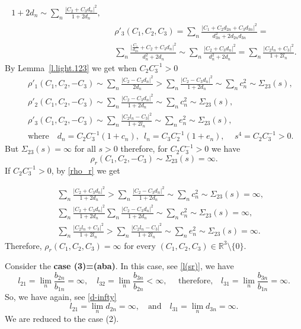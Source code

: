 \documentclass[preprint,12pt]{elsarticle}
\numberwithin{equation}{section}
\begin{document}
\begin{pf}
\begin{eqnarray*}
 {1+2d_{n}}\sim \sum_n\frac{\vert C_2\!+\!C_3d_{n}\vert^2}{1+2d_{n}},\\
&&
\rho'_3(C_1,C_2,C_3)=
\sum_n\frac{\vert C_1\!+\!C_2d_{2n}\!+\!C_3d_{3n}\vert^2}
 {d^2_{3n}+2d_{2n}d_{3n}}=
\\
 &&
\sum_n\frac{\vert \frac{C_1}{d_{2n}}\!+\!C_2\!+\!C_3d_{n}\vert^2}
 {d_n^2+2d_{n}}\sim \sum_n\frac{\vert C_2\!+\!C_3d_{n}\vert^2}{d_n^2+2d_{n}}=\sum_n\frac{\vert C_2l_n\!+\!C_3\vert^2}{1+2l_{n}}.
\end{eqnarray*}
By Lemma~\ref{l.light.123}  we get when $C_2C_3^{-1}>0$
\begin{eqnarray}
\nonumber 
&&
\rho'_1(C_1,C_2,-C_3)\sim  \sum_n\frac{\vert C_2\!-\!C_3d_{n}\vert^2}{2d_{n}}>\sum_n\frac{\vert C_2\!-\!C_3d_{n}\vert^2}{1+2d_{n}}\sim \sum_nc^2_n\sim\Sigma_{23}(s),\\
\label{rho_r}
&&
\rho'_2(C_1,C_2,-C_3)\sim  \sum_n\frac{\vert C_2\!-\!C_3d_{n}\vert^2}{1+2d_{n}}\sim \sum_nc^2_n\sim\Sigma_{23}(s),\\
\nonumber
&&
\rho'_3(C_1,C_2,-C_3)\sim  \sum_n\frac{\vert C_2l_n\!-\!C_3\vert^2}{1+2l_{n}}\sim \sum_ne^2_n\sim\Sigma_{23}(s),\\
\nonumber
&&
\text{where}\quad d_n=
C_2C_3^{-1}(1+c_n),\,\,\,l_n=C_3C_2^{-1}(1+e_n),\quad\,s^4=C_2C_3^{-1}>0.
\end{eqnarray}
But $\Sigma_{23}(s)=\infty$ for all $s>0$ therefore, for $C_2C^{-1}_3>0$ we have
\begin{equation}
\label{(2)}
\rho_r(C_1,C_2,-C_3)\sim  \Sigma_{23}(s)=\infty.
\end{equation}
If $C_2C^{-1}_3>0$, by \eqref{rho_r} we get

\begin{eqnarray*}
\nonumber 
&&
\sum_n\frac{\vert C_2\!+\!C_3d_{n}\vert^2}{1+2d_{n}}>
\sum_n\frac{\vert C_2\!-\!C_3d_{n}\vert^2}{1+2d_{n}}\sim \sum_nc^2_n\sim\Sigma_{23}(s)=\infty,\\
&&
\sum_n\frac{\vert C_2\!+\!C_3d_{n}\vert^2}{1+2d_{n}}
\sum_n\frac{\vert C_2\!-\!C_3d_{n}\vert^2}{1+2d_{n}}\sim \sum_nc^2_n\sim\Sigma_{23}(s)=\infty,\\
\nonumber
&&
\sum_n\frac{\vert C_2l_n\!+\!C_3\vert^2}{1+2l_{n}}> 
\sum_n\frac{\vert C_2l_n\!-\!C_3\vert^2}{1+2l_{n}}\sim \sum_ne^2_n\sim\Sigma_{23}(s)=\infty.
\end{eqnarray*}
Therefore,
$\rho_r(C_1,C_2,C_3)\!=\!\infty$ for every $(C_1,C_2,C_3)\!\in\!\mathbb R^3\setminus \!\{0\}$.

Consider the {\bf case (3)=(aba)}.
In this case, see \eqref{l(sr)}, we have 
$$
l_{21}\!=\!\lim_n\frac{b_{2n}}{b_{1n}}\!=\!\infty,\quad l_{32}\!=\!\lim_n\frac{b_{3n}}{b_{2n}}<\infty,\quad\text{ therefore,}\quad 
l_{31}\!=\!\lim_n\frac{b_{3n}}{b_{1n}}\!=\!\infty.
$$
So, we have again, see \eqref{d-infty}
\begin{equation*}
 l_{21}\!=\!\lim_nd_{2n}=\infty,\quad\text{and}  \quad
l_{31}\!=\!\lim_nd_{3n}=\infty. 
\end{equation*}
We are reduced to the case (2).



\end{pf}
\end{document}
